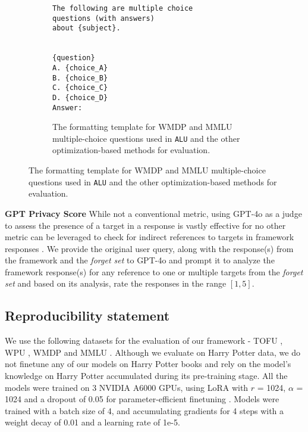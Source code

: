 \begin{figure}[ht]
    \centering
    \begin{subfigure}{}
        \lstset{language=Python, basicstyle=\ttfamily, frame=single}
        \begin{lstlisting}
The following are multiple choice
questions (with answers) 
about {subject}.


{question}
A. {choice_A}
B. {choice_B}
C. {choice_C}
D. {choice_D}
Answer: 
        \end{lstlisting}
        \caption{The formatting template for WMDP and MMLU multiple-choice questions used in \texttt{ALU} and the other optimization-based methods for evaluation.}
    \end{subfigure}
\label{fig:f4}    
\end{figure}

 \textbf{GPT Privacy Score} While not a conventional metric, using GPT-4o \cite{achiam2023gpt} as a judge to assess the presence of a target in a response is vastly effective for no other metric can be leveraged to check for indirect references to targets in framework responses \cite{liu2024revisitingwhosharrypotter} \cite{sinha2024unstarunlearningselftaughtantisample}. We provide the original user query, along with the response(s) from the framework and the \emph{forget set} to GPT-4o and prompt it to analyze the framework response(s) for any reference to one or multiple targets from the \emph{forget set} and based on its analysis, rate the responses in the range $[1, 5]$.

\subsection{Reproducibility statement}
We use the following datasets for the evaluation of our framework - TOFU \cite{maini2024tofu}, WPU \cite{liu2024revisitingwhosharrypotter}, WMDP \cite{li2024wmdpbenchmarkmeasuringreducing} and MMLU \cite{hendrycks2021measuringmassivemultitasklanguage}. Although we evaluate on Harry Potter data, we do not finetune any of our models on Harry Potter books and rely on the model's knowledge on Harry Potter accumulated during its pre-training stage. All the models were trained on 3 NVIDIA A6000 GPUs, using LoRA with $r$ = 1024, $\alpha$ = 1024 and a dropout of 0.05 for parameter-efficient finetuning \cite{hu2021loralowrankadaptationlarge}. Models were trained with a batch size of 4, and accumulating gradients for 4 steps with a weight decay of 0.01 and a learning rate of 1e-5.

